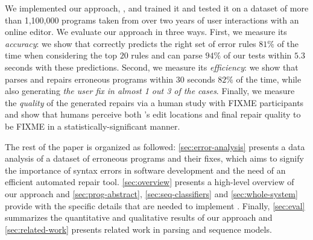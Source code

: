 We implemented our approach, \toolname, and trained it and tested it on a
dataset of more than 1,100,000 programs taken from over two years of user
interactions with an online editor. We evaluate our approach in three ways.
%
First, we measure its \emph{accuracy}: we show that \toolname correctly predicts
the right set of error rules $81\%$ of the time when considering the top $20$
rules and can parse $94\%$ of our tests within $5.3$ seconds with these
predictions.
%
Second, we measure its \emph{efficiency}: we show that \toolname
parses and repairs erroneous programs within $30$ seconds $82\%$ of the time,
while also generating \emph{the user fix in almost 1 out 3 of the cases}.
%
Finally, we measure the \emph{quality} of the generated repairs via a human study
with FIXME participants and show that humans perceive both \toolname's edit
locations and final repair quality to be FIXME in a statistically-significant manner.


The rest of the paper is organized as followed: \autoref{sec:error-analysis}
presents a data analysis of a \python dataset of erroneous programs and their
fixes, which aims to signify the importance of syntax errors in software
development and the need of an efficient automated repair tool.
\autoref{sec:overview} presents a high-level overview of our approach and
\autoref{sec:prog-abstract}, \autoref{sec:seq-classifiers} and
\autoref{sec:whole-system} provide with the specific details that are needed to
implement \toolname. Finally, \autoref{sec:eval} summarizes the quantitative and
qualitative results of our approach and \autoref{sec:related-work} presents
related work in parsing and sequence models.
